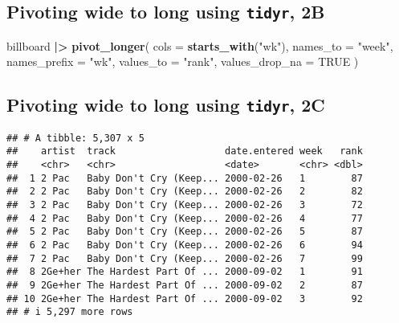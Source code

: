 \documentclass[
  11pt,
]{article}
\newenvironment{Shaded}{\begin{snugshade}}{\end{snugshade}}
\newcommand{\AttributeTok}[1]{\textcolor[rgb]{0.13,0.29,0.53}{#1}}
\newcommand{\ConstantTok}[1]{\textcolor[rgb]{0.56,0.35,0.01}{#1}}
\newcommand{\FunctionTok}[1]{\textcolor[rgb]{0.13,0.29,0.53}{\textbf{#1}}}
\newcommand{\NormalTok}[1]{#1}
\newcommand{\SpecialCharTok}[1]{\textcolor[rgb]{0.81,0.36,0.00}{\textbf{#1}}}
\newcommand{\StringTok}[1]{\textcolor[rgb]{0.31,0.60,0.02}{#1}}
\begin{document}
\normalsize

\hypertarget{pivoting-wide-to-long-using-tidyr-2b}{%
\subsection{\texorpdfstring{Pivoting wide to long using \texttt{tidyr},
2B}{Pivoting wide to long using tidyr, 2B}}\label{pivoting-wide-to-long-using-tidyr-2b}}

\begin{Shaded}
\begin{Highlighting}[]
\NormalTok{billboard }\SpecialCharTok{|\textgreater{}} 
    \FunctionTok{pivot\_longer}\NormalTok{(}
    \AttributeTok{cols =} \FunctionTok{starts\_with}\NormalTok{(}\StringTok{"wk"}\NormalTok{),}
    \AttributeTok{names\_to =} \StringTok{"week"}\NormalTok{,}
    \AttributeTok{names\_prefix =} \StringTok{"wk"}\NormalTok{,}
    \AttributeTok{values\_to =} \StringTok{"rank"}\NormalTok{,}
    \AttributeTok{values\_drop\_na =} \ConstantTok{TRUE}
\NormalTok{  )}
\end{Highlighting}
\end{Shaded}

\hypertarget{pivoting-wide-to-long-using-tidyr-2c}{%
\subsection{\texorpdfstring{Pivoting wide to long using \texttt{tidyr},
2C}{Pivoting wide to long using tidyr, 2C}}\label{pivoting-wide-to-long-using-tidyr-2c}}

\footnotesize

\begin{verbatim}
## # A tibble: 5,307 x 5
##    artist  track                   date.entered week   rank
##    <chr>   <chr>                   <date>       <chr> <dbl>
##  1 2 Pac   Baby Don't Cry (Keep... 2000-02-26   1        87
##  2 2 Pac   Baby Don't Cry (Keep... 2000-02-26   2        82
##  3 2 Pac   Baby Don't Cry (Keep... 2000-02-26   3        72
##  4 2 Pac   Baby Don't Cry (Keep... 2000-02-26   4        77
##  5 2 Pac   Baby Don't Cry (Keep... 2000-02-26   5        87
##  6 2 Pac   Baby Don't Cry (Keep... 2000-02-26   6        94
##  7 2 Pac   Baby Don't Cry (Keep... 2000-02-26   7        99
##  8 2Ge+her The Hardest Part Of ... 2000-09-02   1        91
##  9 2Ge+her The Hardest Part Of ... 2000-09-02   2        87
## 10 2Ge+her The Hardest Part Of ... 2000-09-02   3        92
## # i 5,297 more rows
\end{verbatim}
\end{document}
